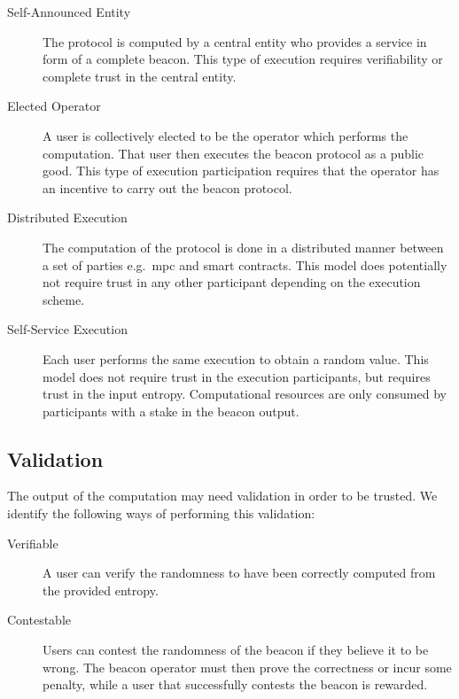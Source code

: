 \begin{description}
    \item[Self-Announced Entity] The protocol is computed by a central entity who provides a service in form of a complete beacon. This type of execution requires verifiability or complete trust in the central entity.
    \item[Elected Operator] A user is collectively elected to be the operator which performs the computation. That user then executes the beacon protocol as a public good. This type of execution participation requires that the operator has an incentive to carry out the beacon protocol.
    \item[Distributed Execution] The computation of the protocol is done in a distributed manner between a set of parties e.g.\ \gls{mpc} and smart contracts. This model does potentially not require trust in any other participant depending on the execution scheme.
    \item[Self-Service Execution] Each user performs the same execution to obtain a random value. This model does not require trust in the execution participants, but requires trust in the input entropy. Computational resources are only consumed by participants with a stake in the beacon output.
\end{description}

\subsection{Validation}
The output of the computation may need validation in order to be trusted. We identify the following ways of performing this validation:
\begin{description}
    \item [Verifiable] A user can verify the randomness to have been correctly computed from the provided entropy. 
    \item [Contestable] Users can contest the randomness of the beacon if they believe it to be wrong. The beacon operator must then prove the correctness or incur some penalty, while a user that successfully contests the beacon is rewarded. 
\end{description}

 